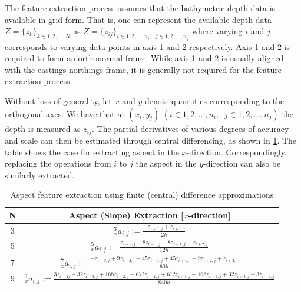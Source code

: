 			The feature extraction process assumes that the bathymetric depth data is available in grid form. That is, one can represent the available depth data $Z = \{z_{k}\}_{k \in {1, 2, ..., N}}$ as $Z = \{z_{ij}\}_{i \in {1, 2, ..., n_{i}}, \;\; j \in {1, 2, ..., n_{j}}}$ where varying $i$ and $j$ corresponds to varying data points in axis 1 and 2 respectively. Axis 1 and 2 is required to form an orthonormal frame. While axis 1 and 2 is usually aligned with the eastings-northings frame, it is generally not required for the feature extraction process.
			
			Without loss of generality, let $x$ and $y$ denote quantities corresponding to the orthogonal axes. We have that at $(x_{i}, y_{j})$ $(i \in {1, 2, ..., n_{i}}, \;\; j \in {1, 2, ..., n_{j}})$ the depth is measured as $z_{ij}$. The partial derivatives of various degrees of accuracy and scale can then be estimated through central differencing, as shown in \cref{Table:AspectExtraction}. The table shows the case for extracting aspect in the $x$-direction. Correspondingly, replacing the operations from $i$ to $j$ the aspect in the $y$-direction can also be similarly extracted.
			
			\bgroup
			\def\arraystretch{2}%
			\begin{table}[h]
				\begin{center}
					\begin{tabular}{ c c }
						\hline
						\hline
						N & Aspect (Slope) Extraction [$x$-direction]\\
						\hline
						\hline
						3 & $^{3}_{x}a_{i, j} := \frac{- z_{i - 1, j} + z_{i + 1, j}}{2h}$ \\
						5 & $^{5}_{x}a_{i, j} := \frac{z_{i - 2, j} - 8 z_{i - 1, j} + 8 z_{i + 1, j} - z_{i + 2, j}}{12h}$ \\
						7 & $^{7}_{x}a_{i, j} := \frac{-z_{i - 3, j} + 9 z_{i - 2, j} - 45 z_{i - 1, j} + 45 z_{i + 1, j} - 9 z_{i + 2, j} + z_{i + 3, j}}{60h}$ \\
						9 & $^{9}_{x}a_{i, j} := \frac{3 z_{i - 4 j} - 32 z_{i - 3, j} + 168 z_{i - 2, j} - 672 z_{i - 1, j} + 672 z_{i + 1, j} - 168 z_{i + 2, j} + 32 z_{i + 3, j} - 3 z_{i + 4, j}}{840h}$ \\
						\hline
						\hline
					\end{tabular}
				\end{center}
		  	\caption{Aspect feature extraction using finite (central) difference approximations}
		  	\label{Table:AspectExtraction}			
		  	\end{table}	
	  		\egroup
	  		
